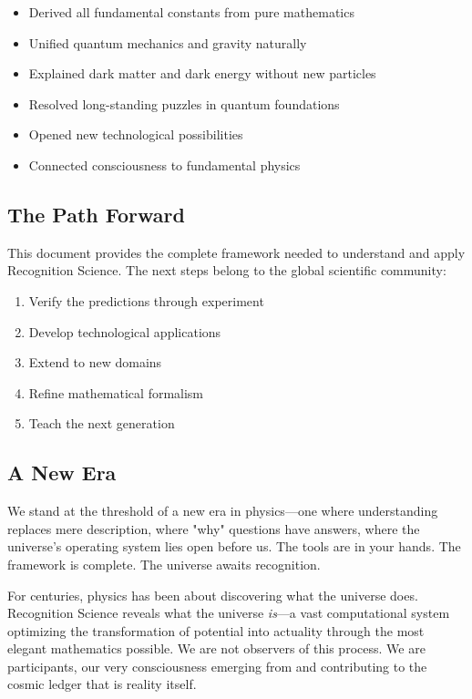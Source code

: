 \documentclass[12pt,a4paper]{article}
\theoremstyle{definition}
\begin{document}
\begin{itemize}
    \item Derived all fundamental constants from pure mathematics
    \item Unified quantum mechanics and gravity naturally
    \item Explained dark matter and dark energy without new particles
    \item Resolved long-standing puzzles in quantum foundations
    \item Opened new technological possibilities
    \item Connected consciousness to fundamental physics
\end{itemize}

\subsection{The Path Forward}

This document provides the complete framework needed to understand and apply Recognition Science. The next steps belong to the global scientific community:

\begin{enumerate}
    \item Verify the predictions through experiment
    \item Develop technological applications
    \item Extend to new domains
    \item Refine mathematical formalism
    \item Teach the next generation
\end{enumerate}

\subsection{A New Era}

We stand at the threshold of a new era in physics—one where understanding replaces mere description, where "why" questions have answers, where the universe's operating system lies open before us. The tools are in your hands. The framework is complete. The universe awaits recognition.

\begin{tcolorbox}[colback=blue!10,colframe=blue!50,title=Final Thought]
For centuries, physics has been about discovering what the universe does. Recognition Science reveals what the universe \textit{is}—a vast computational system optimizing the transformation of potential into actuality through the most elegant mathematics possible. We are not observers of this process. We are participants, our very consciousness emerging from and contributing to the cosmic ledger that is reality itself.
\end{tcolorbox}
\end{document}
